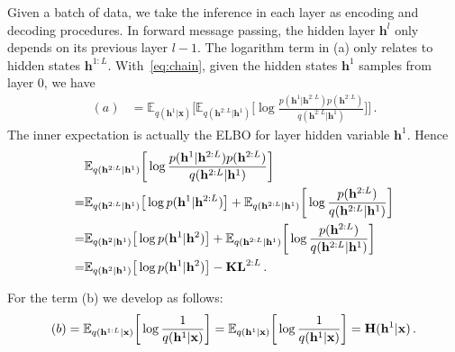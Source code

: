 \documentclass{article} %
\begin{document}
Given a batch of data, we take the inference in each layer as encoding and decoding procedures. In forward message passing, the hidden layer $\mathbf{h}^l$  only depends on its previous layer $l-1$. 
The logarithm term in (a) only relates to hidden states $\mathbf{h}^{1:L}$.  %
With~\eqref{eq:chain}, given the hidden states $\mathbf{h}^1$ samples from layer 0, we have 
\begin{align} \label{eq:kl_a}
(a)  &=   \mathbb{E}_{q(\mathbf{h}^{1}|\mathbf{x})} \bigg[  \mathbb{E}_{q(\mathbf{h}^{2:L}|\mathbf{h}^1)} \bigg[ \log  \frac{p( \mathbf{h}^{1}|  \mathbf{h}^{2:L}) p( \mathbf{h}^{2:L})  }{ q(\mathbf{h}^{2:L}|\mathbf{h}^1)}  \bigg]    \bigg] \, .
\end{align}
The inner expectation is actually the ELBO for layer hidden variable $\mathbf{h}^1$. Hence
\begin{align} \notag
 &\mathbb{E}_{q(\mathbf{h}^{2:L}|\mathbf{h}^1)} \bigg[ \log  \frac{p( \mathbf{h}^{1}|  \mathbf{h}^{2:L}) p( \mathbf{h}^{2:L})  }{ q(\mathbf{h}^{2:L}|\mathbf{h}^1)}  \bigg]   \\ \notag
 =&\mathbb{E}_{q(\mathbf{h}^{2:L}|\mathbf{h}^1)} \big[ \log p( \mathbf{h}^{1}|  \mathbf{h}^{2:L})    \big] + \mathbb{E}_{q(\mathbf{h}^{2:L}|\mathbf{h}^1)} \bigg[ \log  \frac{ p( \mathbf{h}^{2:L})   }{ q(\mathbf{h}^{2:L}|\mathbf{h}^1)}  \bigg]  \\  \label{eq:a_inner}
 =&  \mathbb{E}_{q(\mathbf{h}^{2}|\mathbf{h}^1)} \big[ \log p( \mathbf{h}^{1}|  \mathbf{h}^{2})    \big] + \mathbb{E}_{q(\mathbf{h}^{2:L}|\mathbf{h}^1)} \bigg[ \log  \frac{ p( \mathbf{h}^{2:L})   }{ q(\mathbf{h}^{2:L}|\mathbf{h}^1)}  \bigg] \\ \notag
  =&  \mathbb{E}_{q(\mathbf{h}^{2}|\mathbf{h}^1)} \big[ \log p( \mathbf{h}^{1}|  \mathbf{h}^{2})    \big] - \textbf{\text{KL}}^{2:L}  \, .
\end{align}

For the term (b) we develop as follows:
\begin{align} \label{eq:kl_b}
 (b)  = \mathbb{E}_{q(\mathbf{h}^{1:L} | \mathbf{x})} \bigg[ \log \frac{1}{q(\mathbf{h}^{1}|\mathbf{x}) } \bigg] =  \mathbb{E}_{q(\mathbf{h}^{1} | \mathbf{x})} \bigg[ \log \frac{1}{q(\mathbf{h}^{1}|\mathbf{x}) } \bigg] = \textbf{\text{H}}(\mathbf{h}^{1}|\mathbf{x}) \, .
\end{align}
\end{document}
